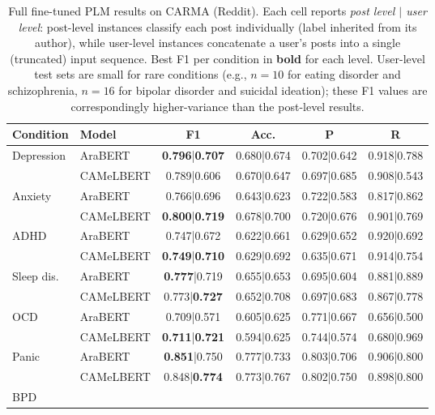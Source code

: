 \documentclass[letterpaper]{article} %
\begin{document}
\begin{table}[t]
\centering
\footnotesize
\setlength{\tabcolsep}{4pt}
\caption{Full fine-tuned PLM results on CARMA (Reddit). Each cell reports \textit{post level $|$ user level}: post-level instances classify each post individually (label inherited from its author), while user-level instances concatenate a user's posts into a single (truncated) input sequence. Best F1 per condition in \textbf{bold} for each level. User-level test sets are small for rare conditions (e.g., $n{=}10$ for eating disorder and schizophrenia, $n{=}16$ for bipolar disorder and suicidal ideation); these F1 values are correspondingly higher-variance than the post-level results.}
\label{tab:results_plm_full}
\begin{tabular}{llcccc}
\toprule
\textbf{Condition} & \textbf{Model} & \textbf{F1} & \textbf{Acc.} & \textbf{P} & \textbf{R} \\
\midrule
\multirow{2}{*}{Depression}
 & AraBERT & \textbf{0.796}|\textbf{0.707} & 0.680|0.674 & 0.702|0.642 & 0.918|0.788 \\
 & CAMeLBERT & 0.789|0.606 & 0.670|0.647 & 0.697|0.685 & 0.908|0.543 \\
\midrule
\multirow{2}{*}{Anxiety}
 & AraBERT & 0.766|0.696 & 0.643|0.623 & 0.722|0.583 & 0.817|0.862 \\
 & CAMeLBERT & \textbf{0.800}|\textbf{0.719} & 0.678|0.700 & 0.720|0.676 & 0.901|0.769 \\
\midrule
\multirow{2}{*}{ADHD}
 & AraBERT & 0.747|0.672 & 0.622|0.661 & 0.629|0.652 & 0.920|0.692 \\
 & CAMeLBERT & \textbf{0.749}|\textbf{0.710} & 0.629|0.692 & 0.635|0.671 & 0.914|0.754 \\
\midrule
\multirow{2}{*}{Sleep dis.}
 & AraBERT & \textbf{0.777}|0.719 & 0.655|0.653 & 0.695|0.604 & 0.881|0.889 \\
 & CAMeLBERT & 0.773|\textbf{0.727} & 0.652|0.708 & 0.697|0.683 & 0.867|0.778 \\
\midrule
\multirow{2}{*}{OCD}
 & AraBERT & 0.709|0.571 & 0.605|0.625 & 0.771|0.667 & 0.656|0.500 \\
 & CAMeLBERT & \textbf{0.711}|\textbf{0.721} & 0.594|0.625 & 0.744|0.574 & 0.680|0.969 \\
\midrule
\multirow{2}{*}{Panic}
 & AraBERT & \textbf{0.851}|0.750 & 0.777|0.733 & 0.803|0.706 & 0.906|0.800 \\
 & CAMeLBERT & 0.848|\textbf{0.774} & 0.773|0.767 & 0.802|0.750 & 0.898|0.800 \\
\midrule
\multirow{2}{*}{BPD}

\end{tabular}
\end{table}
\end{document}
